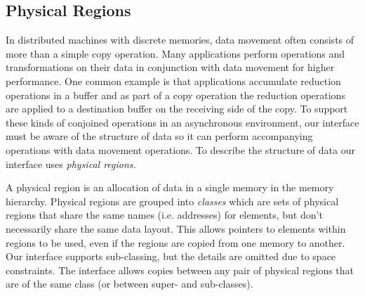 \subsection{Physical Regions}
\label{subsec:phyreg}
In distributed machines with discrete memories, data movement often consists of more
than a simple copy operation.  Many applications perform operations and transformations on
their data in conjunction with data movement for higher performance.  One common example is 
that applications accumulate reduction operations in a buffer and as part of a copy operation 
the reduction operations are applied to a destination buffer on the receiving side of the copy.  
To support these kinds of conjoined operations in an asynchronous environment, our interface 
must be aware of the structure of data so it can perform accompanying operations with 
data movement operations.  To describe the structure of data our interface uses {\em physical regions.}

A physical region is an allocation of data in a single memory in the memory hierarchy.  Physical
regions are grouped into {\em classes} which are sets of physical regions that share the
same names (i.e. addresses) for elements, but don't necessarily share the same data layout.  This
allows pointers to elements within regions to be used, even if the regions are copied from one memory
to another.  Our
interface supports sub-classing, but the details are omitted due to space constraints.  The
interface allows copies between any pair of physical regions that are of
the same class (or between super- and sub-classes).  



